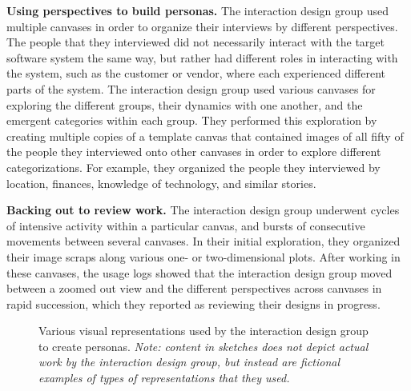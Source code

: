 \textbf{Using perspectives to build personas.} The interaction design group used multiple canvases in order to organize their interviews by different perspectives. The people that they interviewed did not necessarily interact with the target software system the same way, but rather had different roles in interacting with the system, such as the customer or vendor, where each experienced different parts of the system. The interaction design group used various canvases for exploring the different groups, their dynamics with one another, and the emergent categories within each group. They performed this exploration by creating multiple copies of a template canvas that contained images of all fifty of the people they interviewed onto other canvases in order to explore different categorizations. For example, they organized the people they interviewed by location, finances, knowledge of technology, and similar stories. 

\textbf{Backing out to review work.} The interaction design group underwent cycles of intensive activity within a particular canvas, and bursts of consecutive movements between several canvases. In their initial exploration, they organized their image scraps along various one- or two-dimensional plots. After working in these canvases, the usage logs showed that the interaction design group moved between a zoomed out view and the different perspectives across canvases in rapid succession, which they reported as reviewing their designs in progress.

\begin{figure}%
  \centering
   \caption {Various visual representations used by the interaction design group to create personas. \textit{Note: content in sketches does not depict actual work by the interaction design group, but instead are fictional examples of types of representations that they used.}}
   \label{fig:ixdgroup:session1}
\end{figure}%

